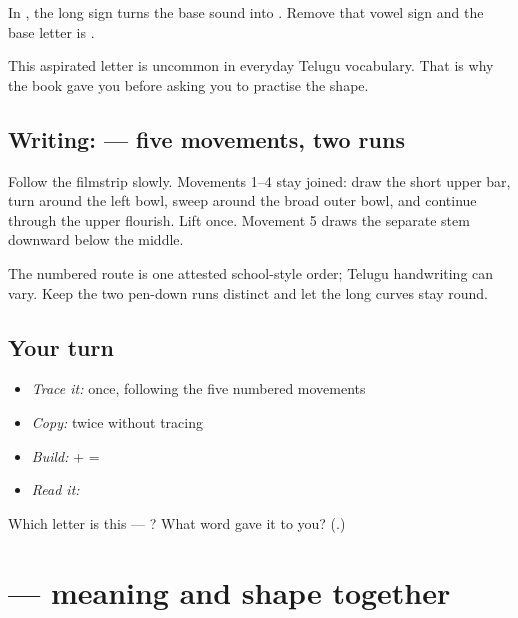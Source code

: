 In \textbf{}, the long \textbf{} sign turns the base sound into \textbf{}. Remove that vowel sign and the base letter is \textbf{}.

This aspirated letter is uncommon in everyday Telugu vocabulary. That is why the book gave you \textbf{} before asking you to practise the shape.

\subsection*{Writing:  — five movements, two runs}

Follow the filmstrip slowly. Movements 1–4 stay joined: draw the short upper bar, turn around the left bowl, sweep around the broad outer bowl, and continue through the upper flourish. Lift once. Movement 5 draws the separate stem downward below the middle.

The numbered route is one attested school-style order; Telugu handwriting can vary. Keep the two pen-down runs distinct and let the long curves stay round.

\subsection*{Your turn}
\begin{itemize}
\raggedright
  \item \emph{Trace it:} \textbf{} once, following the five numbered movements
  \item \emph{Copy:} \textbf{} twice without tracing
  \item \emph{Build:} \textbf{} + \textbf{} = \textbf{}
  \item \emph{Read it:} \textbf{}
\end{itemize}

\begin{tcolorbox}[breakable,colback=teal!4,colframe=teal!35!black,title={Before you move on}]
Which letter is this — \textbf{}? What word gave it to you? (\textbf{}.)
\end{tcolorbox}
\section[\texorpdfstring{\te{ఛాయ} (chāya)}{ఛాయ (chāya)}]{ — meaning and shape together}

